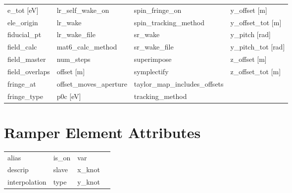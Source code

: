 \begin{tabular}{llll}
e_tot [eV]                       & lr_self_wake_on                  & spin_fringe_on                   & y_offset [m]                     \\
ele_origin                       & lr_wake                          & spin_tracking_method             & y_offset_tot [m]                 \\
fiducial_pt                      & lr_wake_file                     & sr_wake                          & y_pitch [rad]                    \\
field_calc                       & mat6_calc_method                 & sr_wake_file                     & y_pitch_tot [rad]                \\
field_master                     & num_steps                        & superimpose                      & z_offset [m]                     \\
field_overlaps                   & offset [m]                       & symplectify                      & z_offset_tot [m]                 \\
fringe_at                        & offset_moves_aperture            & taylor_map_includes_offsets      &                                  \\
fringe_type                      & p0c [eV]                         & tracking_method                  &                                  \\
 \bottomrule
 \end{tabular}
 \vfill
 
 \section{Ramper Element Attributes}
 \label{s:list.ramper}
 
 \begin{tabular}{llll} \toprule
alias                            & is_on                            & var                              &                                  \\
descrip                          & slave                            & x_knot                           &                                  \\
interpolation                    & type                             & y_knot                           &                                  \\
 \bottomrule
 \end{tabular}
 \vfill
 
